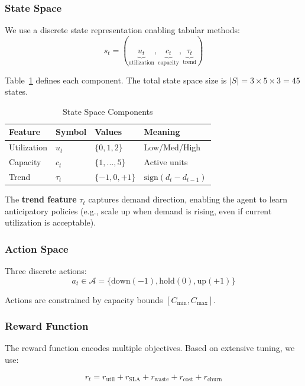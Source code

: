 \documentclass[conference]{IEEEtran}
\begin{document}
\subsubsection{State Space}
We use a discrete state representation enabling tabular methods:
\begin{equation}
s_t = (\underbrace{u_t}_{\text{utilization}}, \underbrace{c_t}_{\text{capacity}}, \underbrace{\tau_t}_{\text{trend}})
\end{equation}

Table~\ref{tab:state} defines each component. The total state space size is $|S| = 3 \times 5 \times 3 = 45$ states.

\begin{table}[htbp]
\centering
\caption{State Space Components}
\label{tab:state}
\begin{tabular}{llll}
\toprule
\textbf{Feature} & \textbf{Symbol} & \textbf{Values} & \textbf{Meaning} \\
\midrule
Utilization & $u_t$ & $\{0,1,2\}$ & Low/Med/High \\
Capacity & $c_t$ & $\{1,...,5\}$ & Active units \\
Trend & $\tau_t$ & $\{-1,0,+1\}$ & $\text{sign}(d_t - d_{t-1})$ \\
\bottomrule
\end{tabular}
\end{table}

The \textbf{trend feature} $\tau_t$ captures demand direction, enabling the agent to learn anticipatory policies (e.g., scale up when demand is rising, even if current utilization is acceptable).

\subsubsection{Action Space}
Three discrete actions:
\begin{equation}
a_t \in \mathcal{A} = \{\text{down}(-1), \text{hold}(0), \text{up}(+1)\}
\end{equation}

Actions are constrained by capacity bounds $[C_{\min}, C_{\max}]$.

\subsubsection{Reward Function}
The reward function encodes multiple objectives. Based on extensive tuning, we use:

\begin{equation}
r_t = r_{\text{util}} + r_{\text{SLA}} + r_{\text{waste}} + r_{\text{cost}} + r_{\text{churn}}
\label{eq:reward}
\end{equation}
\end{document}
